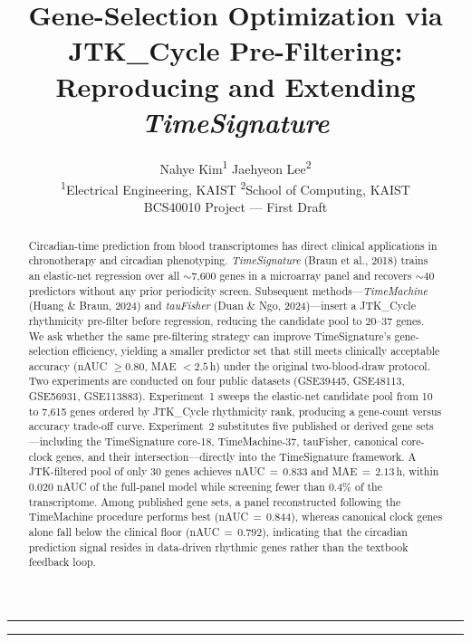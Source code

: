 \documentclass[10pt,a4paper]{article}
\title{\Large\textbf{Gene-Selection Optimization via JTK\_Cycle Pre-Filtering:}\\
       \Large\textbf{Reproducing and Extending \emph{TimeSignature}}}
\author{
  \normalsize Nahye Kim\textsuperscript{1} \quad
  Jaehyeon Lee\textsuperscript{2}\\
  {\small \textsuperscript{1}Electrical Engineering, KAIST \quad
   \textsuperscript{2}School of Computing, KAIST}\\[8pt]
  {\small BCS40010 Project --- First Draft}
}
\date{}
\begin{document}
\maketitle

\vspace{0.5em}
\noindent\rule{\linewidth}{0.4pt}
\vspace{-4pt}


\vspace{4pt}
\noindent\rule{\linewidth}{0.4pt}
\vspace{1.5em}

\begin{abstract}
Circadian-time prediction from blood transcriptomes has direct
clinical applications in chronotherapy and circadian phenotyping.
\emph{TimeSignature} (Braun et al., 2018) trains an elastic-net
regression over all ${\sim}$7,600 genes in a microarray panel and
recovers ${\sim}$40 predictors without any prior periodicity screen.
Subsequent methods---\emph{TimeMachine} (Huang \& Braun, 2024) and
\emph{tauFisher} (Duan \& Ngo, 2024)---insert a JTK\_Cycle
rhythmicity pre-filter before regression, reducing the candidate pool
to 20--37 genes.
We ask whether the same pre-filtering strategy can improve
TimeSignature's gene-selection efficiency, yielding a smaller
predictor set that still meets clinically acceptable accuracy
(nAUC $\geq 0.80$, MAE $< 2.5$\,h) under the original two-blood-draw
protocol.
Two experiments are conducted on four public datasets
(GSE39445, GSE48113, GSE56931, GSE113883).
Experiment~1 sweeps the elastic-net candidate pool from 10 to
7,615 genes ordered by JTK\_Cycle rhythmicity rank, producing a
gene-count versus accuracy trade-off curve.
Experiment~2 substitutes five published or derived gene
sets---including the TimeSignature core-18, TimeMachine-37,
tauFisher, canonical core-clock genes, and their
intersection---directly into the TimeSignature framework.
A JTK-filtered pool of only 30 genes achieves
nAUC\,${=}\,0.833$ and MAE\,${=}\,2.13$\,h, within 0.020 nAUC of
the full-panel model while screening fewer than 0.4\% of the
transcriptome.
Among published gene sets, a panel reconstructed following the
TimeMachine procedure performs best
(nAUC\,${=}\,0.844$), whereas canonical clock genes alone fall below
the clinical floor (nAUC\,${=}\,0.792$), indicating that the
circadian prediction signal resides in data-driven rhythmic genes
rather than the textbook feedback loop.
\end{abstract}
\end{document}
